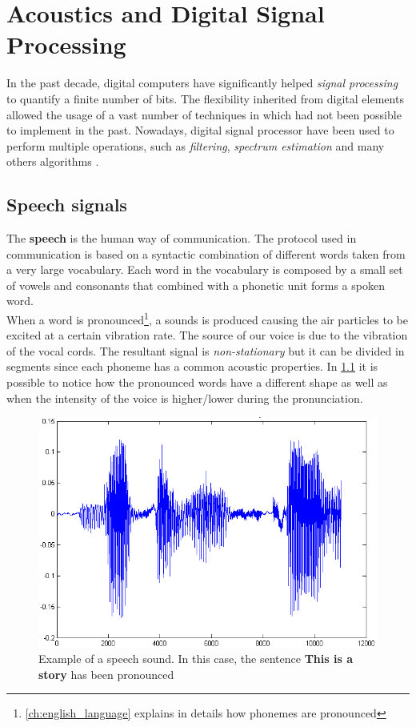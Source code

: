 \chapter{Acoustics and Digital Signal Processing}
\label{ch:speech analysis}
In the past decade, digital computers have significantly helped \textit{signal processing} to quantify a finite number of bits. The flexibility inherited from digital elements allowed the usage of a vast number of techniques in which had not been possible to implement in the past. Nowadays, digital signal processor have been used to perform multiple operations, such as \textit{filtering}, \textit{spectrum estimation} and many others algorithms \cite{orfanidis1995introduction}.


\section{Speech signals}
\label{sec:speech_signals}
The \textbf{speech} is the human way of communication. The protocol used in communication is based on a syntactic combination of different words taken from a very large vocabulary. Each word in the vocabulary is composed by a small set of vowels and consonants that combined with a phonetic unit forms a spoken word. \\
\noindent When a word is pronounced\footnote{\ref{ch:english_language} explains in details how phonemes are pronounced}, a sounds is produced causing the air particles to be excited at a certain vibration rate. The source of our voice is due to the vibration of the vocal cords. The resultant signal is \textit{non-stationary} but it can be divided in segments since each phoneme has a common acoustic properties. In \ref{fig:ex_sound_wave} it is possible to notice how the pronounced words have a different shape as well as when the intensity of the voice is higher/lower during the pronunciation.

\begin{figure}[!ht]
	\centering
	\includegraphics[scale=0.4]{Figures/ex_speech.png}
	\caption{Example of a speech sound. In this case, the sentence \textbf{This is a story} has been pronounced \cite{ex_speech_image}}
	\label{fig:ex_sound_wave}
\end{figure}

